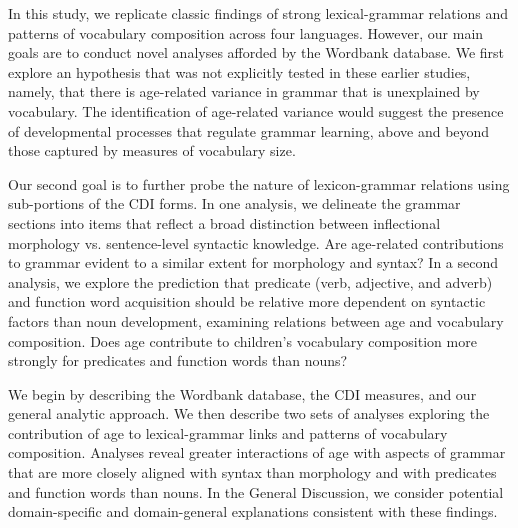 \documentclass[10pt,letterpaper]{article}
\begin{document}

In this study, we replicate classic findings of strong lexical-grammar relations and patterns of vocabulary composition across four languages. However, our main goals are to conduct novel analyses afforded by the Wordbank database. We first explore an hypothesis that was not explicitly tested in these earlier studies, namely, that there is age-related variance in grammar that is unexplained by vocabulary. The identification of age-related variance would suggest the presence of developmental processes that regulate grammar learning, above and beyond those captured by measures of vocabulary size.

Our second goal is to further probe the nature of lexicon-grammar relations using sub-portions of the CDI forms. In one analysis, we delineate the grammar sections into items that reflect a broad distinction between inflectional morphology vs. sentence-level syntactic knowledge. Are age-related contributions to grammar evident to a similar extent for morphology and syntax?  In a second analysis, we explore the prediction that predicate (verb, adjective, and adverb) and function word acquisition should be relative more dependent on syntactic factors than noun development, examining relations between age and vocabulary composition. Does age contribute to children's vocabulary composition more strongly for predicates and function words than nouns? 



We begin by describing the Wordbank database, the CDI measures, and our general analytic approach. We then describe two sets of analyses exploring the contribution of age to lexical-grammar links and patterns of vocabulary composition.  Analyses reveal greater interactions of age with aspects of grammar that are more closely aligned with syntax than morphology and with predicates and function words than nouns. In the General Discussion, we consider potential domain-specific and domain-general explanations consistent with these findings. 
\end{document}
